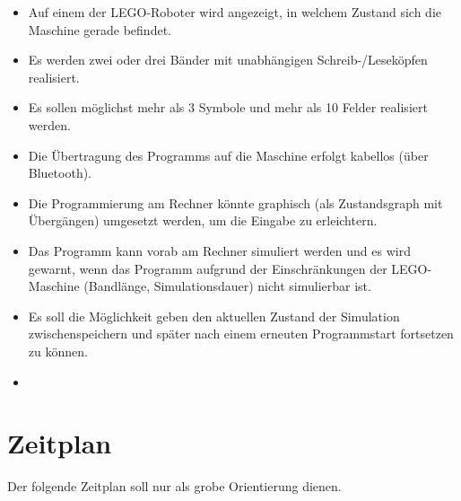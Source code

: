 \documentclass[a4paper,12pt]{article}
\begin{document}
\begin{itemize}
\item Auf einem der LEGO-Roboter wird angezeigt, in welchem Zustand sich die Maschine gerade befindet.
\item Es werden zwei oder drei Bänder mit unabhängigen Schreib-/Leseköpfen realisiert.
\item Es sollen möglichst mehr als 3 Symbole und mehr als 10 Felder realisiert werden.
\item Die Übertragung des Programms auf die Maschine erfolgt kabellos (über Bluetooth).
\item Die Programmierung am Rechner könnte graphisch (als Zustandsgraph mit Übergängen) umgesetzt werden, um die Eingabe zu erleichtern.
\item Das Programm kann vorab am Rechner simuliert werden und es wird gewarnt, wenn das Programm aufgrund der Einschränkungen der LEGO-Maschine (Bandlänge, Simulationsdauer) nicht simulierbar ist.
\item Es soll die Möglichkeit geben den aktuellen Zustand der Simulation zwischenspeichern und später nach einem erneuten Programmstart fortsetzen zu können.
\item {}
\end{itemize}

\section{Zeitplan}

Der folgende Zeitplan soll nur als grobe Orientierung dienen.\\
\end{document}
